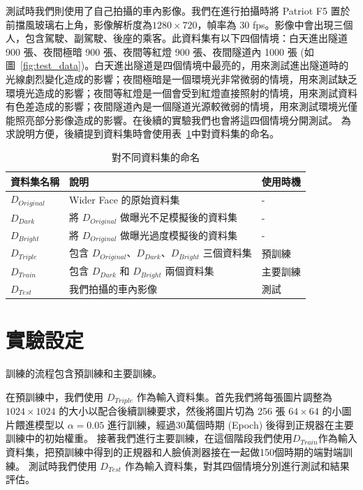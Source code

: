 測試時我們則使用了自己拍攝的車內影像。我們在進行拍攝時將 Patriot F5 置於前擋風玻璃右上角，影像解析度為$1280 \times 720$，幀率為 30 fps。影像中會出現三個人，包含駕駛、副駕駛、後座的乘客。此資料集有以下四個情境：白天進出隧道 900 張、夜間極暗 900 張、夜間等紅燈 900 張、夜間隧道內 1000 張 (如圖~\ref{fig:test_data})。白天進出隧道是四個情境中最亮的，用來測試進出隧道時的光線劇烈變化造成的影響；夜間極暗是一個環境光非常微弱的情境，用來測試缺乏環境光造成的影響；夜間等紅燈是一個會受到紅燈直接照射的情境，用來測試資料有色差造成的影響；夜間隧道內是一個隧道光源較微弱的情境，用來測試環境光僅能照亮部分影像造成的影響。在後續的實驗我們也會將這四個情境分開測試。
為求說明方便，後續提到資料集時會使用表~\ref{table:model_names}中對資料集的命名。
\begin{table}[ht]
    \caption{對不同資料集的命名}
    \centering
    \begin{tabular}{l l l}
        \hline
        資料集名稱 & 說明 & 使用時機 \\
        \hline
        $D_{Original}$ & Wider Face 的原始資料集 & - \\
        $D_{Dark}$ & 將 $D_{Original}$ 做曝光不足模擬後的資料集 & - \\
        $D_{Bright}$ & 將 $D_{Original}$ 做曝光過度模擬後的資料集 & - \\
        $D_{Triple}$ & 包含 $D_{Original}$、$D_{Dark}$、$D_{Bright}$ 三個資料集 & 預訓練 \\
        $D_{Train}$	& 包含 $D_{Dark}$ 和 $D_{Bright}$ 兩個資料集 & 主要訓練 \\
        $D_{Test}$ & 我們拍攝的車內影像 & 測試 \\
        \hline
    \end{tabular}
    \label{table:model_names}
\end{table}

\section{實驗設定}

訓練的流程包含預訓練和主要訓練。

在預訓練中，我們使用 $D_{Triple}$ 作為輸入資料集。首先我們將每張圖片調整為 $1024 \times 1024$ 的大小以配合後續訓練要求，然後將圖片切為 256 張 $64 \times 64$ 的小圖片餵進模型以 $\alpha = 0.05$ 進行訓練，經過30萬個時期 (Epoch) 後得到正規器在主要訓練中的初始權重。
接著我們進行主要訓練，在這個階段我們使用$D_{Train}$作為輸入資料集，把預訓練中得到的正規器和人臉偵測器接在一起做150個時期的端對端訓練。
測試時我們使用 $D_{Test}$ 作為輸入資料集，對其四個情境分別進行測試和結果評估。

